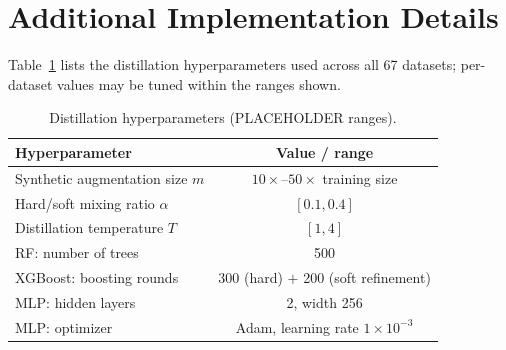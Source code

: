 \documentclass[10pt]{article}
\begin{document}
\appendix
\section{Additional Implementation Details}
Table~\ref{tab:hparams} lists the distillation hyperparameters used
across all 67 datasets; per-dataset values may be tuned within the
ranges shown.

\begin{table}[h]
\centering
\small
\caption{Distillation hyperparameters (PLACEHOLDER ranges).}
\label{tab:hparams}
\begin{tabular}{@{}lc@{}}
\toprule
\textbf{Hyperparameter} & \textbf{Value / range} \\
\midrule
Synthetic augmentation size $m$ & $10\times$--$50\times$ training size \\
Hard/soft mixing ratio $\alpha$ & $[0.1, 0.4]$ \\
Distillation temperature $T$ & $[1, 4]$ \\
RF: number of trees & 500 \\
XGBoost: boosting rounds & 300 (hard) $+$ 200 (soft refinement) \\
MLP: hidden layers & 2, width 256 \\
MLP: optimizer & Adam, learning rate $1\times10^{-3}$ \\
\bottomrule
\end{tabular}
\end{table}
\end{document}
